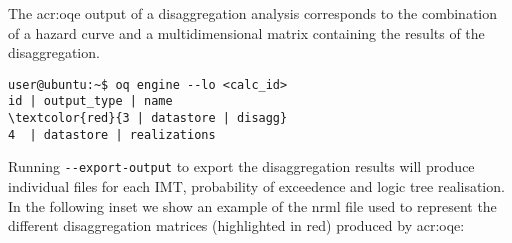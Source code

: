 The \glsdesc{acr:oqe} output of a disaggregation analysis corresponds to the
combination of a hazard curve and a multidimensional matrix containing the
results of the disaggregation.

\begin{Verbatim}[frame=single, commandchars=\\\{\}, fontsize=\small]
user@ubuntu:~$ oq engine --lo <calc_id>
id | output_type | name
\textcolor{red}{3 | datastore | disagg}
4  | datastore | realizations
\end{Verbatim}
%

Running \texttt{-{}-export-output} to export the disaggregation results will produce individual files for each IMT, probability of exceedence and logic tree realisation. In the following inset we show an example of the nrml file used to represent the different disaggregation matrices (highlighted in red) produced by
\gls{acr:oqe}:

